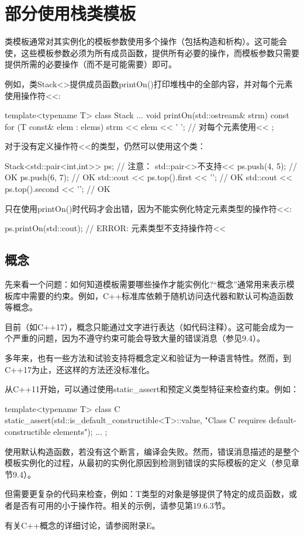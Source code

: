 \section{部分使用栈类模板}

类模板通常对其实例化的模板参数使用多个操作（包括构造和析构）。这可能会使，这些模板参数必须为所有成员函数，提供所有必要的操作，而模板参数只需要提供所需的必要操作（而不是可能需要）即可。

例如，类Stack<>提供成员函数printOn()打印堆栈中的全部内容，并对每个元素使用操作符<{}<:

\begin{cpp}
template<typename T>
class Stack {
	...
	void printOn(std::ostream& strm) const {
		for (T const& elem : elems) {
			strm << elem << ' '; // 对每个元素使用<<
		}
	}
};
\end{cpp}

对于没有定义操作符<{}<的类型，仍然可以使用这个类：

\begin{cpp}
Stack<std::pair<int,int>> ps; // 注意： std::pair<>不支持<<
ps.push({4, 5}); // OK
ps.push({6, 7}); // OK
std::cout << ps.top().first << '\n'; // OK
std::cout << ps.top().second << '\n'; // OK
\end{cpp}

只在使用printOn()时代码才会出错，因为不能实例化特定元素类型的操作符<{}<:

\begin{cpp}
ps.printOn(std::cout); // ERROR: 元素类型不支持操作符<<
\end{cpp}

\subsection{概念}

先来看一个问题：如何知道模板需要哪些操作才能实例化?“概念”通常用来表示模板库中需要的约束。例如，C++标准库依赖于随机访问迭代器和默认可构造函数等概念。

目前（如C++17），概念只能通过文字进行表达（如代码注释）。这可能会成为一个严重的问题，因为不遵守约束可能会导致大量的错误消息（参见9.4）。

多年来，也有一些方法和试验支持将概念定义和验证为一种语言特性。然而，到C++17为止，还这样的方法还没标准化。

从C++11开始，可以通过使用static\_assert和预定义类型特征来检查约束。例如：

\begin{cpp}
template<typename T>
class C
{
	static_assert(std::is_default_constructible<T>::value,
	"Class C requires default-constructible elements");
	...
};
\end{cpp}

使用默认构造函数，若没有这个断言，编译会失败。然而，错误消息描述的是整个模板实例化的过程，从最初的实例化原因到检测到错误的实际模板的定义（参见章节9.4）。

但需要更复杂的代码来检查，例如：T类型的对象是够提供了特定的成员函数，或者是否有可用的小于操作符。相关的示例，请参见第19.6.3节。

有关C++概念的详细讨论，请参阅附录E。















